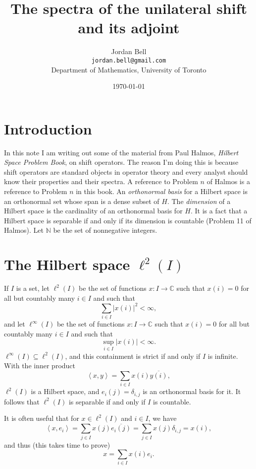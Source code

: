 \documentclass{article}
\newcommand{\inner}[2]{\left\langle #1, #2 \right\rangle}
\begin{document}
\title{The spectra of the unilateral shift  and its adjoint}
\author{Jordan Bell\\ \texttt{jordan.bell@gmail.com}\\Department of Mathematics, University of Toronto}
\date{\today}
\maketitle

\section{Introduction}
In this note I am writing out some of the material from Paul Halmos, {\em Hilbert Space Problem Book}, on shift operators. The reason I'm doing this is because shift operators are standard objects in operator theory and every analyst should know their
properties and their spectra. A reference to Problem $n$ of Halmos is a reference to Problem $n$ in this book. 
An {\em orthonormal basis} for a Hilbert space is an orthonormal set whose span is a dense subset of $H$. The {\em dimension} of a Hilbert space is the cardinality of
an orthonormal basis for $H$. It is a fact that a Hilbert space is separable if and only if its dimension is countable (Problem 11 of Halmos). 
Let $\mathbb{N}$ be the set of nonnegative integers.

\section{The Hilbert space $\ell^2(I)$}
If $I$ is a set, let $\ell^2(I)$ be the set of functions $x:I \to \mathbb{C}$ such that $x(i)=0$ for all but countably many $i \in I$ and such
that 
\[
\sum_{i \in I} |x(i)|^2 < \infty,
\]
and let $\ell^\infty(I)$ be the set of functions $x:I \to \mathbb{C}$ such that $x(i)=0$ for all but countably many $i \in I$ and such that
\[
\sup_{i \in I} |x(i)| < \infty.
\]
$\ell^\infty(I) \subseteq \ell^2(I)$, and this containment is strict if and only if $I$ is infinite.
With the inner product
\[
\inner{x}{y}=\sum_{i \in I} x(i) \overline{y(i)},
\]
$\ell^2(I)$ is a Hilbert space, and $e_i(j)=\delta_{i,j}$ is an orthonormal basis for it. It follows that
$\ell^2(I)$ is separable if and only if $I$ is countable.

It is often useful that for $x \in \ell^2(I)$ and $i \in I$, we have
\[
\inner{x}{e_i}=\sum_{j \in I} x(j) \overline{e_i(j)} = \sum_{j \in I} x(j) \delta_{i,j} = x(i),
\]
and thus (this takes time to prove)
\[
x=\sum_{i \in I} x(i) e_i.
\]
\end{document}
